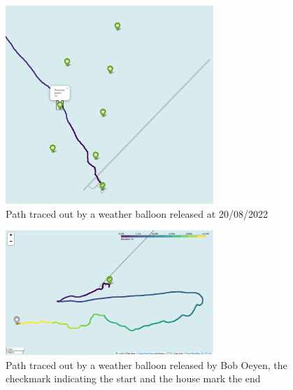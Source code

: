 \documentclass[11pt,a4paper,faculty=we,language=en,doctype=report]{cls/ugent-doc}
\begin{document}
\begin{figure}
  \centering
	\includegraphics[width=0.7\textwidth]{PathSMT_20220820_111609.pdf}
  \caption{Path traced out by a weather balloon released at 20/08/2022}
  \label{fig:ExampleBalloonPathCrossing12}
\end{figure}
\begin{figure}
  \centering
	\includegraphics[width=0.7\textwidth]{WeatherBalloonPath.png}
  \caption{Path traced out by a weather balloon released by Bob Oeyen, the checkmark indicating the start and the house mark
  the end}
  \label{fig:ExampleBalloonPath}
\end{figure}
\end{document}
